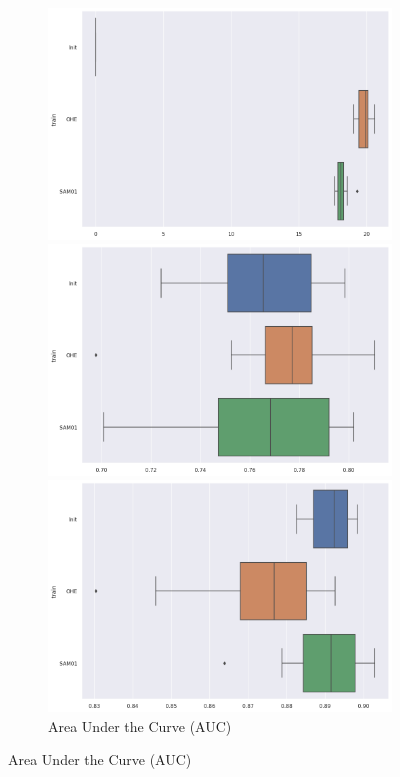 \documentclass{article}
\theoremstyle{definition}
\begin{document}
\begin{figure}[H]
\begin{subfigure}[b]{0.24\textwidth}
         \includegraphics[width=\textwidth]{imgs/BreastCancer/Bal/Boxplot_MC.png}
         \caption{Correlation Matrix Difference with the initial train}
         \quad
         \includegraphics[width=\textwidth]{imgs/BreastCancer/Bal/Boxplot_AUC.png}
         \caption{Area Under the Curve (AUC)}
         \quad
         \includegraphics[width=\textwidth]{imgs/BreastCancer/Bal/Boxplot_F1S.png}

\end{subfigure}
\end{figure}
\end{document}
